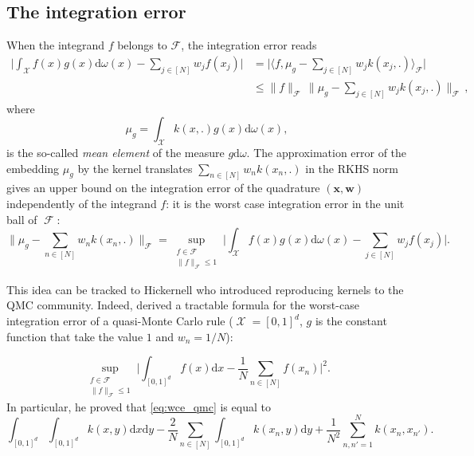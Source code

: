 \documentclass[twoside,11pt]{book}
\DeclareMathOperator{\F}{\mathcal{F}}
\DeclareMathOperator{\X}{\mathcal{X}}
\begin{document}
\subsection{The integration error}
\label{subsec:int_error}
When the integrand $f$ belongs to $\mathcal{F}$, the integration error reads \citep{SmGrSoSc07}
\begin{align}
\label{eq:integral_bound_mean_element}
  \bigg|\int_{\mathcal{X}} f(x)g(x)\mathrm{d}\omega(x) - \sum\limits_{j \in [N]} w_{j}f(x_{j}) \bigg|
  & = \bigg|\langle f, \mu_{g} - \sum\limits_{j \in [N]} w_{j} k(x_{j},.) \rangle_{\mathcal{F}} \bigg|\nonumber\\
  & \leq \|f\|_{\mathcal{F}} \, \Big\|\mu_{g} - \sum\limits_{j \in [N]} w_{j} k(x_{j},.)\Big\|_{\mathcal{F}}\,,
\end{align}
where
\begin{equation}
\mu_{g} = \int_{\mathcal{X}} k(x,.) g(x) \mathrm{d}\omega(x),
\end{equation}
 is the so-called \emph{mean element} \citep{DiPi14,MuFuSrSc17} of the measure $g \mathrm{d}\omega$. The approximation error of the embedding $\mu_{g}$ by the kernel translates $\displaystyle \sum\limits_{n \in [N]} w_{n}k(x_{n},.)$ in the RKHS norm gives an upper bound on the integration error of the quadrature $(\bm{x}, \bm{w})$ independently of the integrand $f$: it is the worst case integration error in the unit ball of $\F$:
\begin{equation}\label{eq:wce_kquadrature}
\|\mu_{g} - \sum\limits_{n \in [N]}w_{n} k(x_{n},.) \|_{\mathcal{F}} = \sup\limits_{\substack{f \in \mathcal{F}\\ \|f\|_{\mathcal{F}} \leq 1}} \bigg|\int_{\mathcal{X}} f(x)g(x)\mathrm{d}\omega(x) - \sum\limits_{j \in [N]} w_{j}f(x_{j}) \bigg|.
\end{equation}





This idea can be tracked to Hickernell \citep{Hic96,Hic98} who introduced reproducing kernels to the QMC community. Indeed, \cite{Hic96} derived a tractable formula for the worst-case integration error of a quasi-Monte Carlo rule ($\X=[0,1]^{d}$, $g$ is the constant function that take the value $1$ and $w_{n}= 1/N$):

\begin{equation}\label{eq:wce_qmc}
 \sup\limits_{\substack{f \in \mathcal{F}\\ \|f\|_{\mathcal{F}} \leq 1}} \bigg|\int_{[0,1]^{d}} f(x)\mathrm{d}x - \frac{1}{N}\sum\limits_{n \in [N]} f(x_{n}) \bigg|^{2}.
\end{equation}
In particular, he proved that \eqref{eq:wce_qmc} is equal to 
\begin{equation}\label{eq:wce_qmc_2}
 \int_{[0,1]^{d}}\int_{[0,1]^{d}} k(x,y) \mathrm{d}x \mathrm{d}y - \frac{2}{N}\sum\limits_{n \in [N]} \int_{[0,1]^{d}} k(x_{n},y) \mathrm{d} y + \frac{1}{N^2}\sum\limits_{n,n'=1}^{N}k(x_{n},x_{n'}).
\end{equation}
\end{document}

